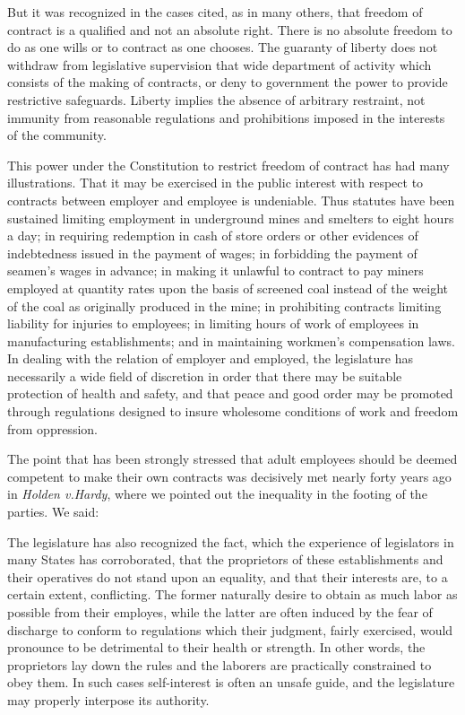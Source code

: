 \documentclass[
  letterpaper,
  11pt,
  DIV=9,
  openright]{scrbook}
\renewenvironment{quote}{
  \list{}{\leftmargin=2em\rightmargin=2em}
  \item\relax\small
}
{\endlist}
\begin{document}
\begin{quote}
But it was recognized in the cases cited, as in many others, that
freedom of contract is a qualified and not an absolute right. There is
no absolute freedom to do as one wills or to contract as one chooses.
The guaranty of liberty does not withdraw from legislative supervision
that wide department of activity which consists of the making of
contracts, or deny to government the power to provide restrictive
safeguards. Liberty implies the absence of arbitrary restraint, not
immunity from reasonable regulations and prohibitions imposed in the
interests of the community.
\end{quote}

This power under the Constitution to restrict freedom of contract has
had many illustrations. That it may be exercised in the public interest
with respect to contracts between employer and employee is undeniable.
Thus statutes have been sustained limiting employment in underground
mines and smelters to eight hours a day; in requiring redemption in cash
of store orders or other evidences of indebtedness issued in the payment
of wages; in forbidding the payment of seamen's wages in advance; in
making it unlawful to contract to pay miners employed at quantity rates
upon the basis of screened coal instead of the weight of the coal as
originally produced in the mine; in prohibiting contracts limiting
liability for injuries to employees; in limiting hours of work of
employees in manufacturing establishments; and in maintaining workmen's
compensation laws. In dealing with the relation of employer and
employed, the legislature has necessarily a wide field of discretion in
order that there may be suitable protection of health and safety, and
that peace and good order may be promoted through regulations designed
to insure wholesome conditions of work and freedom from oppression.

The point that has been strongly stressed that adult employees should be
deemed competent to make their own contracts was decisively met nearly
forty years ago in \emph{Holden v.Hardy}, where we pointed out the
inequality in the footing of the parties. We said:

\begin{quote}
The legislature has also recognized the fact, which the experience of
legislators in many States has corroborated, that the proprietors of
these establishments and their operatives do not stand upon an equality,
and that their interests are, to a certain extent, conflicting. The
former naturally desire to obtain as much labor as possible from their
employes, while the latter are often induced by the fear of discharge to
conform to regulations which their judgment, fairly exercised, would
pronounce to be detrimental to their health or strength. In other words,
the proprietors lay down the rules and the laborers are practically
constrained to obey them. In such cases self-interest is often an unsafe
guide, and the legislature may properly interpose its authority.
\end{quote}
\end{document}
